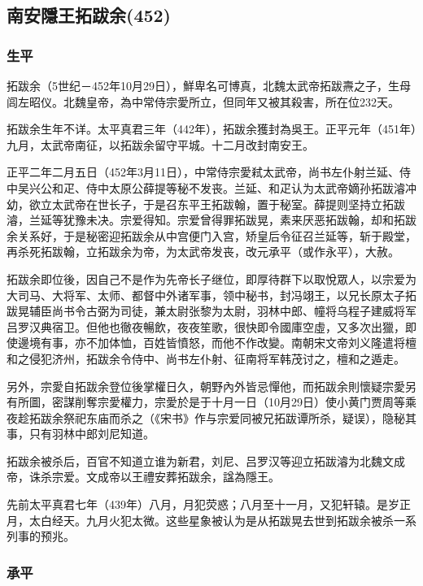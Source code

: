 
\subsection{南安隱王拓跋余\tiny(452)}

\subsubsection{生平}

拓跋余（5世纪－452年10月29日），鮮卑名可博真，北魏太武帝拓跋燾之子，生母闾左昭仪。北魏皇帝，為中常侍宗愛所立，但同年又被其殺害，所在位232天。

拓跋余生年不详。太平真君三年（442年），拓跋余獲封為吳王。正平元年（451年）九月，太武帝南征，以拓跋余留守平城。十二月改封南安王。

正平二年二月五日（452年3月11日），中常侍宗愛弒太武帝，尚书左仆射兰延、侍中吴兴公和疋、侍中太原公薛提等秘不发丧。兰延、和疋认为太武帝嫡孙拓跋濬冲幼，欲立太武帝在世长子，于是召东平王拓跋翰，置于秘室。薛提则坚持立拓跋濬，兰延等犹豫未决。宗爱得知。宗爱曾得罪拓跋晃，素来厌恶拓跋翰，却和拓跋余关系好，于是秘密迎拓跋余从中宫便门入宫，矫皇后令征召兰延等，斩于殿堂，再杀死拓跋翰，立拓跋余为帝，为太武帝发丧，改元承平（或作永平），大赦。

拓跋余即位後，因自己不是作为先帝长子继位，即厚待群下以取悅眾人，以宗爱为大司马、大将军、太师、都督中外诸军事，领中秘书，封冯翊王，以兄长原太子拓跋晃辅臣尚书令古弼为司徒，兼太尉张黎为太尉，羽林中郎、幢将乌程子建威将军吕罗汉典宿卫。但他也徹夜暢飲，夜夜笙歌，很快即令國庫空虛，又多次出獵，即使邊境有事，亦不加体恤，百姓皆憤怒，而他不作改變。南朝宋文帝刘义隆遣将檀和之侵犯济州，拓跋余令侍中、尚书左仆射、征南将军韩茂讨之，檀和之遁走。

另外，宗愛自拓跋余登位後掌權日久，朝野內外皆忌憚他，而拓跋余則懷疑宗愛另有所圖，密謀削奪宗愛權力，宗愛於是于十月一日（10月29日）使小黄门贾周等乘夜趁拓跋余祭祀东庙而杀之（《宋书》作与宗爱同被兄拓跋谭所杀，疑误），隐秘其事，只有羽林中郎刘尼知道。

拓跋余被杀后，百官不知道立谁为新君，刘尼、吕罗汉等迎立拓跋濬为北魏文成帝，诛杀宗爱。文成帝以王禮安葬拓跋余，諡為隱王。

先前太平真君七年（439年）八月，月犯荧惑；八月至十一月，又犯轩辕。是岁正月，太白经天。九月火犯太微。这些星象被认为是从拓跋晃去世到拓跋余被杀一系列事的预兆。

\subsubsection{承平}

